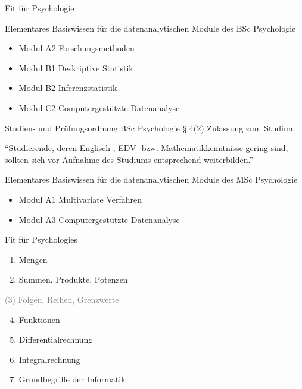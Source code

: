 \documentclass[
  8pt,
  ignorenonframetext,
]{beamer}
\providecommand{\tightlist}{%
  \setlength{\itemsep}{0pt}\setlength{\parskip}{0pt}}
\begin{document}
\begin{frame}{Fit für Psychologie}
\protect\hypertarget{fit-fuxfcr-psychologie}{}

Elementares Basiswissen für die datenanalytischen Module des BSc
Psychologie

\small

\begin{itemize}
\tightlist
\item
  Modul A2 Forschungsmethoden
\item
  Modul B1 Deskriptive Statistik
\item
  Modul B2 Inferenzstatistik
\item
  Modul C2 Computergestützte Datenanalyse
\end{itemize}

\normalsize

Studien- und Prüfungsordnung BSc Psychologie § 4(2) Zulassung zum
Studium

\small

``Studierende, deren Englisch-, EDV- bzw. Mathematikkenntnisse gering
sind, sollten sich vor Aufnahme des Studiums entsprechend
weiterbilden.''

\normalsize

Elementares Basiswissen für die datenanalytischen Module des MSc
Psychologie

\small

\begin{itemize}
\tightlist
\item
  Modul A1 Multivariate Verfahren
\item
  Modul A3 Computergestützte Datenanalyse
\end{itemize}
\end{frame}

\begin{frame}{Fit für Psychologies}
\protect\hypertarget{fit-fuxfcr-psychologies}{}
\large
\vfill

\begin{enumerate}
[(1)]
\item
  Mengen
\item
  Summen, Produkte, Potenzen
\end{enumerate}

\textcolor{gray}{(3) Folgen, Reihen, Grenzwerte}

\begin{enumerate}
[(1)]
\setcounter{enumi}{3}
\item
  Funktionen
\item
  Differentialrechnung
\item
  Integralrechnung
\item
  Grundbegriffe der Informatik \vfill
\end{enumerate}
\end{frame}
\end{document}
